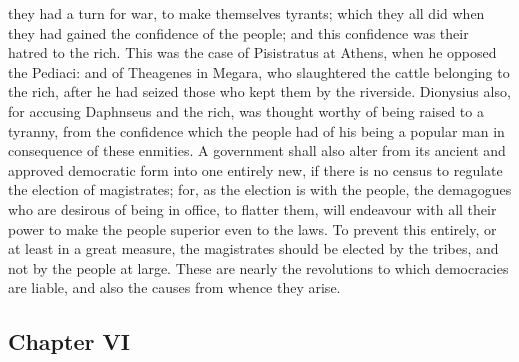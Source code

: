 \documentclass[12pt]{article}
\begin{document}
they had a turn for war, to make themselves tyrants; which they all did when they had gained the confidence of the people; and this confidence was their hatred to the rich. This was the case of Pisistratus at Athens, when he opposed the Pediaci: and of Theagenes in Megara, who slaughtered the cattle belonging to the rich, after he had seized those who kept them by the riverside. Dionysius also, for accusing Daphnseus and the rich, was thought worthy of being raised to a tyranny, from the confidence which the people had of his being a popular man in consequence of these enmities. A government shall also alter from its ancient and approved democratic form into one entirely new, if there is no census to regulate the election of magistrates; for, as the election is with the people, the demagogues who are desirous of being in office, to flatter them, will endeavour with all their power to make the people superior even to the laws. To prevent this entirely, or at least in a great measure, the magistrates should be elected by the tribes, and not by the people at large. These are nearly the revolutions to which democracies are liable, and also the causes from whence they arise.

\subsection*{Chapter VI}
\end{document}
